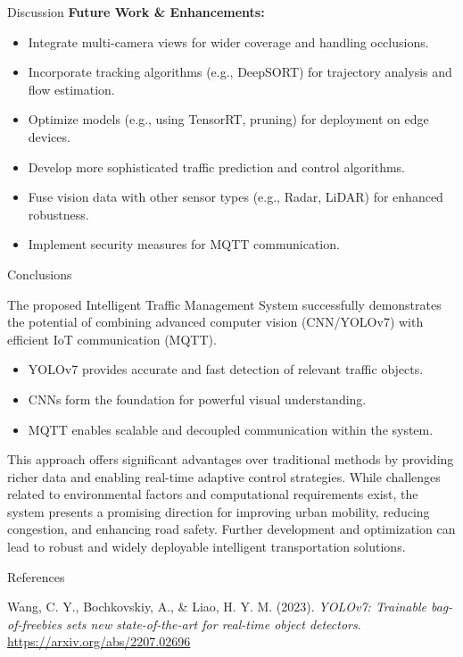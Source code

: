 \documentclass[final]{beamer}
\newlength{\colwidth}
\begin{document}
\begin{frame}[t]
\begin{columns}[t]
\begin{column}{\colwidth}
\begin{block}{Discussion}
    \textbf{Future Work \& Enhancements:}
    \begin{itemize}
      \item Integrate multi-camera views for wider coverage and handling occlusions.
      \item Incorporate tracking algorithms (e.g., DeepSORT) for trajectory analysis and flow estimation.
      \item Optimize models (e.g., using TensorRT, pruning) for deployment on edge devices.
      \item Develop more sophisticated traffic prediction and control algorithms.
      \item Fuse vision data with other sensor types (e.g., Radar, LiDAR) for enhanced robustness.
      \item Implement security measures for MQTT communication.
    \end{itemize}
  \end{block}

  \begin{block}{Conclusions}
   
    The proposed Intelligent Traffic Management System successfully demonstrates the potential of combining advanced computer vision (CNN/YOLOv7) with efficient IoT communication (MQTT).
    \begin{itemize}
      \item YOLOv7 provides accurate and fast detection of relevant traffic objects.
      \item CNNs form the foundation for powerful visual understanding.
      \item MQTT enables scalable and decoupled communication within the system.
    \end{itemize}
    This approach offers significant advantages over traditional methods by providing richer data and enabling real-time adaptive control strategies. While challenges related to environmental factors and computational requirements exist, the system presents a promising direction for improving urban mobility, reducing congestion, and enhancing road safety. Further development and optimization can lead to robust and widely deployable intelligent transportation solutions.
  \end{block}

  \vfill

\begin{block}{References}
    \begin{thebibliography}{9}
      Wang, C. Y., Bochkovskiy, A., \& Liao, H. Y. M. (2023). \textit{YOLOv7: Trainable bag-of-freebies sets new state-of-the-art for real-time object detectors}. \\
      \url{https://arxiv.org/abs/2207.02696}
      

\end{thebibliography}
\end{block}
\end{column}
\end{columns}
\end{frame}
\end{document}
